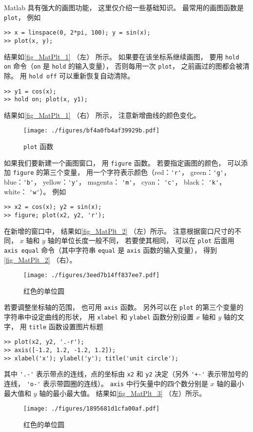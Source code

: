 

Matlab 具有强大的画图功能， 这里仅介绍一些基础知识。 最常用的画图函数是 \verb|plot|， 例如
\begin{lstlisting}[language=matlabC]
>> x = linspace(0, 2*pi, 100); y = sin(x);
>> plot(x, y);
\end{lstlisting}
结果如\autoref{fig_MatPlt_1} （左） 所示。 如果要在该坐标系继续画图， 要用 \verb|hold on| 命令（\verb|on| 是 \verb|hold| 的输入变量）， 否则每用一次 \verb|plot|， 之前画过的图都会被清除。 用 \verb|hold off| 可以重新恢复自动清除。
\begin{lstlisting}[language=matlabC]
>> y1 = cos(x);
>> hold on; plot(x, y1);
\end{lstlisting}
结果如\autoref{fig_MatPlt_1} （右） 所示， 注意新增曲线的颜色变化。
\begin{figure}[ht]
\centering
\texttt{[image: ./figures/bf4a0fb4af39929b.pdf]}
\caption{\lstinline|plot| 函数} \label{fig_MatPlt_1}
\end{figure}

如果我们要新建一个画图窗口， 用 \verb|figure| 函数。 若要指定画图的颜色， 可以添加 \verb|figure| 的第三个变量， 用一个字符表示颜色（red：\verb|'r'|， green：\verb|'g'|， blue：\verb|'b'|， yellow：\verb|'y'|， magenta： \verb|'m'|， cyan： \verb|'c'|， black： \verb|'k'|， white： \verb|'w'|）。 例如
\begin{lstlisting}[language=matlabC]
>> x2 = cos(x); y2 = sin(x);
>> figure; plot(x2, y2, 'r');
\end{lstlisting}
在新增的窗口中， 结果如\autoref{fig_MatPlt_2} （左）所示。 注意根据窗口尺寸的不同， $x$ 轴和 $y$ 轴的单位长度一般不同， 若要使其相同， 可以在 \verb|plot| 后面用 \verb|axis equal| 命令（其中字符串 \verb|equal| 是 \verb|axis| 函数的输入变量）， 得到\autoref{fig_MatPlt_2} （右）。
\begin{figure}[ht]
\centering
\texttt{[image: ./figures/3eed7b14ff837ee7.pdf]}
\caption{红色的单位圆} \label{fig_MatPlt_2}
\end{figure}
若要调整坐标轴的范围， 也可用 \verb|axis| 函数。 另外可以在 \verb|plot| 的第三个变量的字符串中设定曲线的形状， 用 \verb|xlabel| 和 \verb|ylabel| 函数分别设置 $x$ 轴和 $y$ 轴的文字， 用 \verb|title| 函数设置图片标题
\begin{lstlisting}[language=matlabC]
>> plot(x2, y2, '.-r');
>> axis([-1.2, 1.2, -1.2, 1.2]);
>> xlabel('x'); ylabel('y'); title('unit circle');
\end{lstlisting}
其中 \verb|'.-'| 表示带点的连线，点的坐标由 \verb|x2| 和 \verb|y2| 决定（另外 \verb|'+-'| 表示带加号的连线， \verb|'o-'| 表示带圆圈的连线）。 \verb|axis| 中行矢量中的四个数分别是 $x$ 轴的最小最大值和 $y$ 轴的最小最大值。 结果如\autoref{fig_MatPlt_3} （左）所示。
\begin{figure}[ht]
\centering
\texttt{[image: ./figures/1895681d1cfa00af.pdf]}
\caption{红色的单位圆} \label{fig_MatPlt_3}
\end{figure}

